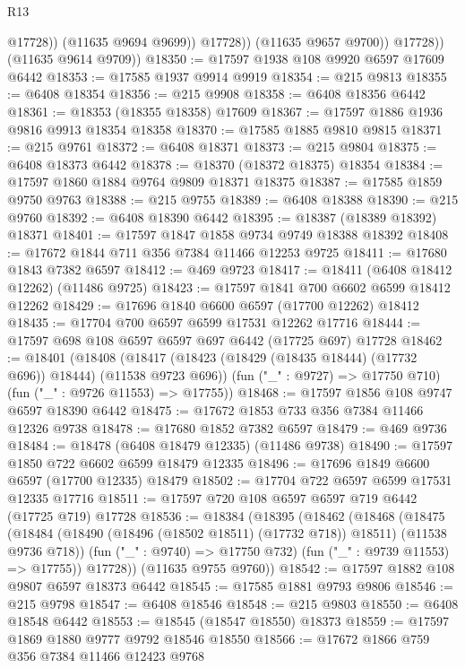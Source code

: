 \begin{lexlean}{R13}
\begin{coremodule}
                      @17728))
                  (@11635 @9694 @9699))
                @17728))
            (@11635 @9657 @9700))
          @17728))
      (@11635 @9614 @9709))
@18350 := @17597 @1938 @108 @9920 @6597 @17609 @6442
@18353 := @17585 @1937 @9914 @9919
@18354 := @215 @9813
@18355 := @6408 @18354
@18356 := @215 @9908
@18358 := @6408 @18356 @6442
@18361 := @18353 (@18355 @18358) @17609
@18367 := @17597 @1886 @1936 @9816 @9913 @18354 @18358
@18370 := @17585 @1885 @9810 @9815
@18371 := @215 @9761
@18372 := @6408 @18371
@18373 := @215 @9804
@18375 := @6408 @18373 @6442
@18378 := @18370 (@18372 @18375) @18354
@18384 := @17597 @1860 @1884 @9764 @9809 @18371 @18375
@18387 := @17585 @1859 @9750 @9763
@18388 := @215 @9755
@18389 := @6408 @18388
@18390 := @215 @9760
@18392 := @6408 @18390 @6442
@18395 := @18387 (@18389 @18392) @18371
@18401 := @17597 @1847 @1858 @9734 @9749 @18388 @18392
@18408 := @17672 @1844 @711 @356 @7384 @11466 @12253 @9725
@18411 := @17680 @1843 @7382 @6597
@18412 := @469 @9723
@18417 := @18411 (@6408 @18412 @12262) (@11486 @9725)
@18423 := @17597 @1841 @700 @6602 @6599 @18412 @12262
@18429 := @17696 @1840 @6600 @6597 (@17700 @12262) @18412
@18435 := @17704 @700 @6597 @6599 @17531 @12262 @17716
@18444 := @17597 @698 @108 @6597 @6597 @697 @6442 (@17725 @697) @17728
@18462 := @18401
    (@18408
      (@18417 (@18423 (@18429 (@18435 @18444) (@17732 @696)) @18444) (@11538 @9723 @696))
      (fun ("_" : @9727) => @17750 @710)
      (fun ("_" : @9726 @11553) => @17755))
@18468 := @17597 @1856 @108 @9747 @6597 @18390 @6442
@18475 := @17672 @1853 @733 @356 @7384 @11466 @12326 @9738
@18478 := @17680 @1852 @7382 @6597
@18479 := @469 @9736
@18484 := @18478 (@6408 @18479 @12335) (@11486 @9738)
@18490 := @17597 @1850 @722 @6602 @6599 @18479 @12335
@18496 := @17696 @1849 @6600 @6597 (@17700 @12335) @18479
@18502 := @17704 @722 @6597 @6599 @17531 @12335 @17716
@18511 := @17597 @720 @108 @6597 @6597 @719 @6442 (@17725 @719) @17728
@18536 := @18384
    (@18395
      (@18462
        (@18468
          (@18475
            (@18484 (@18490 (@18496 (@18502 @18511) (@17732 @718)) @18511) (@11538 @9736 @718))
            (fun ("_" : @9740) => @17750 @732)
            (fun ("_" : @9739 @11553) => @17755))
          @17728))
      (@11635 @9755 @9760))
@18542 := @17597 @1882 @108 @9807 @6597 @18373 @6442
@18545 := @17585 @1881 @9793 @9806
@18546 := @215 @9798
@18547 := @6408 @18546
@18548 := @215 @9803
@18550 := @6408 @18548 @6442
@18553 := @18545 (@18547 @18550) @18373
@18559 := @17597 @1869 @1880 @9777 @9792 @18546 @18550
@18566 := @17672 @1866 @759 @356 @7384 @11466 @12423 @9768

\end{coremodule}
\end{lexlean}
